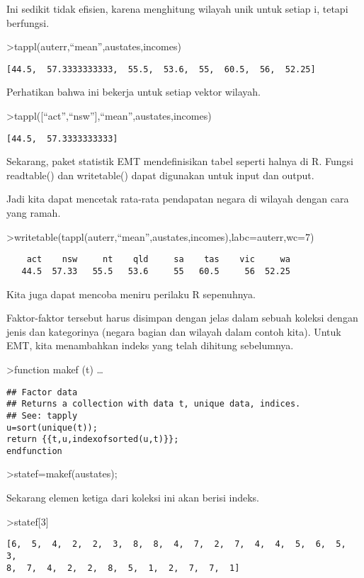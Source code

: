 \documentclass[
]{book}
\begin{document}
Ini sedikit tidak efisien, karena menghitung wilayah unik untuk setiap i, tetapi berfungsi.

\textgreater tappl(auterr,``mean'',austates,incomes)

\begin{verbatim}
[44.5,  57.3333333333,  55.5,  53.6,  55,  60.5,  56,  52.25]
\end{verbatim}

Perhatikan bahwa ini bekerja untuk setiap vektor wilayah.

\textgreater tappl({[}``act'',``nsw''{]},``mean'',austates,incomes)

\begin{verbatim}
[44.5,  57.3333333333]
\end{verbatim}

Sekarang, paket statistik EMT mendefinisikan tabel seperti halnya di R. Fungsi readtable() dan writetable() dapat digunakan untuk input dan output.

Jadi kita dapat mencetak rata-rata pendapatan negara di wilayah dengan cara yang ramah.

\textgreater writetable(tappl(auterr,``mean'',austates,incomes),labc=auterr,wc=7)

\begin{verbatim}
    act    nsw     nt    qld     sa    tas    vic     wa
   44.5  57.33   55.5   53.6     55   60.5     56  52.25
\end{verbatim}

Kita juga dapat mencoba meniru perilaku R sepenuhnya.

Faktor-faktor tersebut harus disimpan dengan jelas dalam sebuah koleksi dengan jenis dan kategorinya (negara bagian dan wilayah dalam contoh kita). Untuk EMT, kita menambahkan indeks yang telah dihitung sebelumnya.

\textgreater function makef (t) \ldots{}

\begin{verbatim}
## Factor data
## Returns a collection with data t, unique data, indices.
## See: tapply
u=sort(unique(t));
return {{t,u,indexofsorted(u,t)}};
endfunction
\end{verbatim}

\textgreater statef=makef(austates);

Sekarang elemen ketiga dari koleksi ini akan berisi indeks.

\textgreater statef{[}3{]}

\begin{verbatim}
[6,  5,  4,  2,  2,  3,  8,  8,  4,  7,  2,  7,  4,  4,  5,  6,  5,  3,
8,  7,  4,  2,  2,  8,  5,  1,  2,  7,  7,  1]
\end{verbatim}
\end{document}
